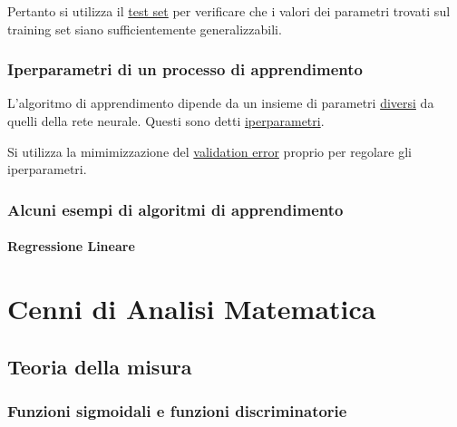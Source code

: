\documentclass[10pt]{book}
\newcommand{\1}{\mathds{1}}
\theoremstyle{definition}%
\theoremstyle{plain}
\theoremstyle{remark}
\begin{document}
Pertanto si utilizza il \uline{test set} per verificare che i valori dei parametri trovati sul training set siano sufficientemente generalizzabili.
\subsection{Iperparametri di un processo di apprendimento}
\label{sec:orgbc83b07}
L'algoritmo di apprendimento dipende da un insieme di parametri \uline{diversi} da quelli della rete neurale. Questi sono detti \uline{iperparametri}.

Si utilizza la mimimizzazione del \uline{validation error} proprio per regolare gli iperparametri.
\subsection{Alcuni esempi di algoritmi di apprendimento}
\label{sec:org5ccdf8b}

\subsubsection{Regressione Lineare}
\label{sec:org71041be}
\chapter{Cenni di Analisi Matematica}
\label{sec:org3476f14}

\section{Teoria della misura}
\label{sec:orgb88a416}

\subsection{Funzioni sigmoidali e funzioni discriminatorie}
\label{sec:org2e8370f}
\end{document}
